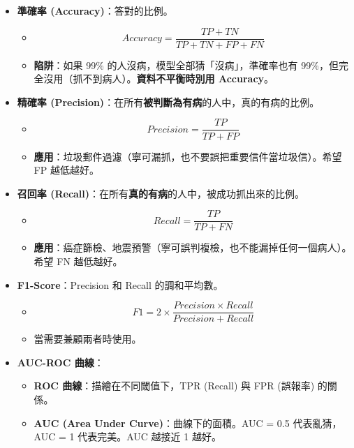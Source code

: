 \documentclass[
  letterpaper,
  DIV=11,
  numbers=noendperiod]{scrreprt}
\providecommand{\tightlist}{%
  \setlength{\itemsep}{0pt}\setlength{\parskip}{0pt}}
\begin{document}
\begin{itemize}
\tightlist
\item
  \textbf{準確率 (Accuracy)}：答對的比例。

  \begin{itemize}
  \tightlist
  \item
    \[ Accuracy = \frac{TP + TN}{TP + TN + FP + FN} \]
  \item
    \textbf{陷阱}：如果 99\% 的人沒病，模型全部猜「沒病」，準確率也有
    99\%，但完全沒用（抓不到病人）。\textbf{資料不平衡時別用 Accuracy}。
  \end{itemize}
\item
  \textbf{精確率
  (Precision)}：在所有\textbf{被判斷為有病}的人中，真的有病的比例。

  \begin{itemize}
  \tightlist
  \item
    \[ Precision = \frac{TP}{TP + FP} \]
  \item
    \textbf{應用}：垃圾郵件過濾（寧可漏抓，也不要誤把重要信件當垃圾信）。希望
    FP 越低越好。
  \end{itemize}
\item
  \textbf{召回率
  (Recall)}：在所有\textbf{真的有病}的人中，被成功抓出來的比例。

  \begin{itemize}
  \tightlist
  \item
    \[ Recall = \frac{TP}{TP + FN} \]
  \item
    \textbf{應用}：癌症篩檢、地震預警（寧可誤判複檢，也不能漏掉任何一個病人）。希望
    FN 越低越好。
  \end{itemize}
\item
  \textbf{F1-Score}：Precision 和 Recall 的調和平均數。

  \begin{itemize}
  \tightlist
  \item
    \[ F1 = 2 \times \frac{Precision \times Recall}{Precision + Recall} \]
  \item
    當需要兼顧兩者時使用。
  \end{itemize}
\item
  \textbf{AUC-ROC 曲線}：

  \begin{itemize}
  \tightlist
  \item
    \textbf{ROC 曲線}：描繪在不同閾值下，TPR (Recall) 與 FPR (誤報率)
    的關係。
  \item
    \textbf{AUC (Area Under Curve)}：曲線下的面積。AUC = 0.5
    代表亂猜，AUC = 1 代表完美。AUC 越接近 1 越好。
  \end{itemize}
\end{itemize}
\end{document}
